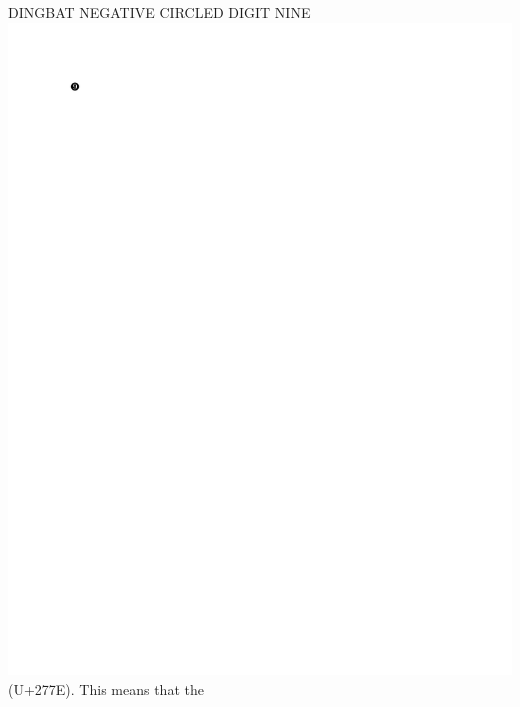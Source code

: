 \begin{description}
DINGBAT NEGATIVE CIRCLED DIGIT NINE \includegraphics{uni/unicode_277E} (U+277E). This means that the

\end{description}
